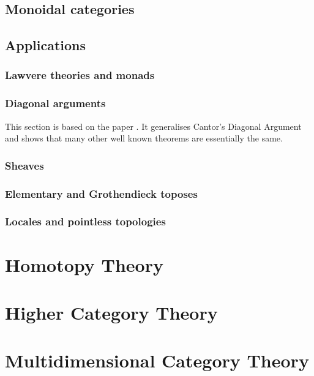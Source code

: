\documentclass[12pt]{report}
\theoremstyle{definition}
\begin{document}
\section{Monoidal categories}

\section{Applications}

\subsection{Lawvere theories and monads}

\subsection{Diagonal arguments}\label{sec:category-theory:diagonal-arguments}
This section is based on the paper \cite{lawvere:diagonal_arguments_and_cartesian_closed_categories}. It generalises Cantor's Diagonal Argument and shows that many other well known theorems are essentially the same.




\subsection{Sheaves}

\subsection{Elementary and Grothendieck toposes}

\subsection{Locales and pointless topologies}



\chapter{Homotopy Theory}\label{cha:homotopy-theory}

\chapter{Higher Category Theory}\label{cha:higher-category-theory}

\chapter{Multidimensional Category Theory}\label{cha:mult-categ-theory}
\end{document}
